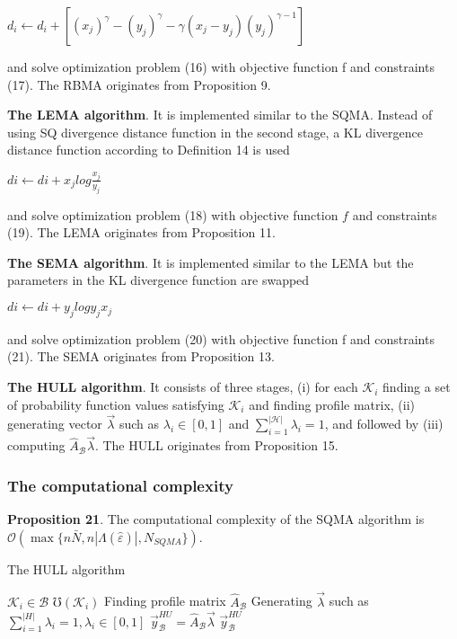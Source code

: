\documentclass[]{iosart2c}
\begin{document}
$d_i \gets d_i + \left[ (x_j)^\gamma - (y_j)^\gamma - \gamma(x_j - y_j)(y_j)^{\gamma-1} \right]$

and solve optimization problem (16) with objective function f and constraints (17). The RBMA originates from Proposition 
9.

\textbf{The LEMA algorithm}. It is implemented similar 
to the SQMA. Instead of using SQ divergence distance
 function in the second stage, a KL divergence
distance function according to Definition 14 is used 

$di \gets di + x_j log{\frac{x_j}{y_j}}$

and solve optimization problem (18) with objective function $f$ and constraints (19). The LEMA originates from Proposition 11.

\textbf{The SEMA algorithm}. It is implemented similar to the LEMA but the parameters in the KL divergence function are swapped

$di \gets di + y_j log{{y_j}{x_j}}$

and solve optimization problem (20) with objective function f and constraints (21). The SEMA originates from Proposition 13.

\textbf{The HULL algorithm}. It consists of three stages, (i) for each $\mathcal{K}_i$ finding a set of probability function
values satisfying $\mathcal{K}_i$ and finding profile matrix, (ii)
generating vector $\vec{\lambda}$ such as $\lambda_i \in [0, 1]$ and
$\sum^|\mathcal{H}|_{i=1} \lambda_i = 1$, and followed by (iii) computing $\hat{A}_\mathcal{B}\vec{\lambda}$. The HULL originates from Proposition 15.
\subsubsection{The computational complexity}

\textbf{Proposition 21}. The computational complexity of the
SQMA algorithm is $\mathcal{O}(\max\{n \bar{N}, n|\Lambda(\hat{\varepsilon})|,N_{SQMA} \})$.

\begin{algorithm}
\caption{The HULL algorithm}
\begin{algorithmic}[1]
\For $\mathcal{K}_i \in \mathcal{B}$
  \State $\mho(\mathcal{K}_i)$
\EndFor
\State Finding profile matrix $\hat{A}_\mathcal{B}$
\State Generating $\vec{\lambda}$ such as $\sum^|H|_{i=1} \lambda_i = 1, \lambda_i \in [0, 1]$
\State $\vec{y}^{HU}_\mathcal{B} = \hat{A}_\mathcal{B} \vec{\lambda}$
\State \Return $\vec{y}^{HU}_\mathcal{B}$
\end{algorithmic}
\end{algorithm}
\end{document}
